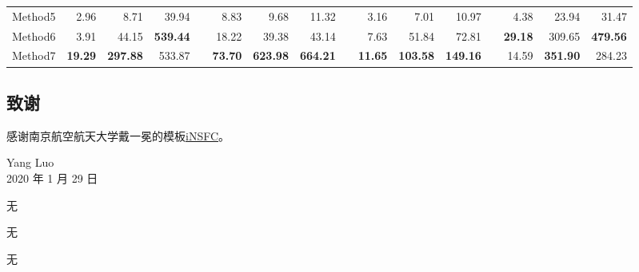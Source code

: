 \begin{table}[htb!]
\begin{tabular}{lrrrrrrrrrrrrrrr}
		Method5 & 2.96                        & 8.71                        & 39.94                       &           & 8.83                        & 9.68                        & 11.32                       &           & 3.16                        & 7.01                        & 10.97                       &           & 4.38                        & 23.94                       & 31.47                       \\
		Method6 & 3.91                        & 44.15                       & \textbf{539.44}             & \textbf{} & 18.22                       & 39.38                       & 43.14                       &           & 7.63                        & 51.84                       & 72.81                       &           & \textbf{29.18}              & 309.65                      & \textbf{479.56}             \\
		Method7 & \textbf{19.29}              & \textbf{297.88}             & 533.87                      &           & \textbf{73.70}              & \textbf{623.98}             & \textbf{664.21}             & \textbf{} & \textbf{11.65}              & \textbf{103.58}             & \textbf{149.16}             & \textbf{} & 14.59                       & \textbf{351.90}             & 284.23                      \\
		\bottomrule
	\end{tabular}%
	\label{tab:Quantitative}%
\end{table}%

\subsection*{致谢}
感谢南京航空航天大学戴一冕的模板\href{https://github.com/YimianDai/iNSFC}{iNSFC}。

{
	\raggedleft 
	Yang Luo \\
	2020 年 1 月 29 日\\
}


无


无


无